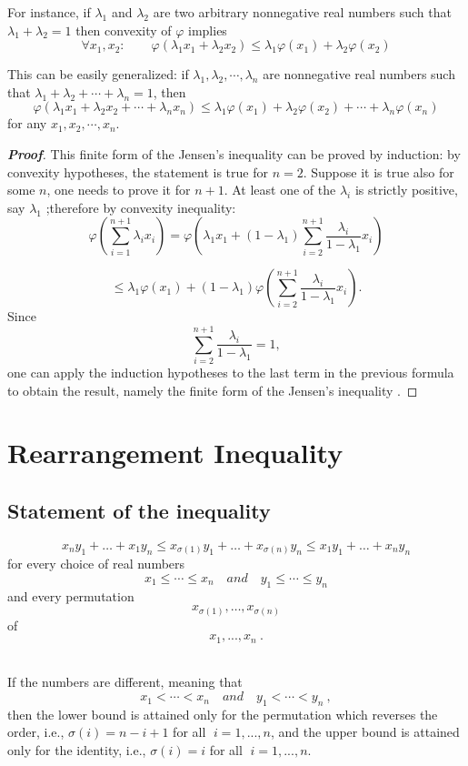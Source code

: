 \documentclass[a4paper]{report}
\begin{document}
For instance, if $\lambda_1$ and $\lambda_2$ are two arbitrary nonnegative real numbers such that $\lambda_1 + \lambda_2 = 1$ then convexity of $\varphi$ implies
\[\forall x_1, x_2 :\qquad \varphi \left(\lambda_1 x_1 +\lambda_2 x_2\right)\leqslant \lambda_1\varphi(x_1)+\lambda_2\varphi(x_2)\]\par\;
This can be easily generalized: if $\lambda_1,\lambda_2, \cdots , \lambda_n$ are nonnegative real numbers such that $\lambda_1 +\lambda_2+ \cdots + \lambda_n = 1$, then
\[\varphi \left( \lambda _{1}x_{1}+\lambda _{2}x_{2}+\cdots +\lambda _{n}x_n\right) \leqslant\lambda _{1}\varphi (x_{1})+\lambda _{2}\varphi (x_{2})+\cdots +\lambda_n\varphi(x_n)\]
for any $x_1, x_2, \cdots , x_n$. 


\begin{proof}[\bf{Proof}]
This finite form of the Jensen's inequality can be proved by induction: by convexity hypotheses, the statement is true for $n = 2$. Suppose it is true also for some $n$, one needs to prove it for $n+1$. At least one of the $\lambda_i$ is strictly positive, say $\lambda_1$ ;therefore by convexity inequality:
\[\varphi \left(\sum_{i=1}^{n+1} \lambda_i x_i \right) = \varphi\left(\lambda_1x_1+(1-\lambda _{1})\sum \limits^{n+1}_{i=2}\frac{\lambda _{i}}{1-\lambda _{1}} x_{i}\right)\]

\[\leqslant \lambda_1\varphi(x_1)+(1-\lambda _{1})\varphi\left(\sum \limits^{n+1}_{i=2}\frac{\lambda _{i}}{1-\lambda _{1}} x_{i}\right).\]
Since
\[\sum \limits^{n+1}_{i=2}\frac{\lambda _{i}}{1-\lambda _{1}} =1,\]
one can apply the induction hypotheses to the last term in the previous formula to obtain the result, namely the finite form of the Jensen's inequality .

\end{proof}


\chapter{Rearrangement Inequality} 
\section{Statement of the inequality}
\begin{thr}
	\begin{equation} 
	x_n y_1+\dots + x_1 y_n\leqslant x_{\sigma (1) } y_1+\dots + x_{\sigma (n)} y_n\leqslant x_1 y_1 +\dots +x_n y_n
	\end{equation}
	for every choice of real numbers
	\[x_1\leqslant \cdots\leqslant x_n \quad and \quad y_1\leqslant\cdots\leqslant y_n\]
	and every permutation
	\[x_{\sigma \left(1\right) } ,\dots , x_{\sigma (n)}\]
	of
	\[x_1,...,x_n\ .\]\\
\end{thr}
If the numbers are different, meaning that
\[x_1< \cdots <x_n \quad and \quad y_1<\cdots <y_n\ ,\]
then the lower bound is attained only for the permutation which reverses the order, i.e.,
$\sigma (i) = n -i +1$ for all $\;i = 1, ... , n$, and the upper bound is attained only for the identity, i.e., $\sigma (i) = i$ for all $\;i = 1, ... , n$.
\end{document}
